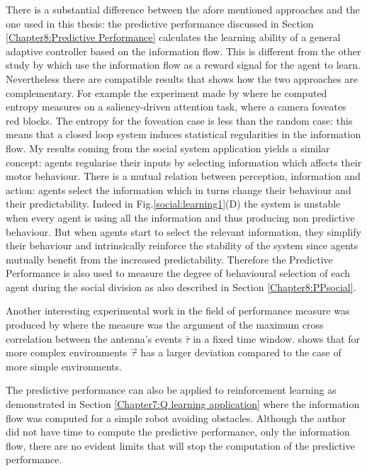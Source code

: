 There is a substantial difference between the afore mentioned approaches and the
one used in this thesis:
the predictive performance discussed in Section \ref{Chapter8:Predictive Performance}
calculates the learning ability of a general adaptive controller
 based on the information flow.
This is different from the other study by \citet{organizationInfo,LungarellaInformationStructure,Ay2008:PredInformation} 
which use the information flow as a reward signal for the agent to learn.
Nevertheless there are compatible results that shows how the
two approaches are complementary.
For example the experiment made by \citet{LungarellaInformationStructure}
where he computed entropy measures on a saliency-driven attention
task, where a camera foveates red blocks. The entropy for the
foveation case is less than the random case:
this means that a closed loop system induces statistical regularities
in the information flow.
My results coming from the social system application yields
a similar concept: agents regularise their inputs
by selecting information which affects their motor behaviour.
There is a mutual relation between perception, information and action:
agents select the information which in turns change their
behaviour and their predictability.
Indeed in Fig.\ref{social:learning1}(D) the system is unstable
when every agent is using all the information and thus producing
non predictive behaviour. But when agents start to select the
relevant information, they simplify their behaviour and intrinsically reinforce
the stability of the system since agents mutually benefit from the increased predictability.
Therefore the Predictive Performance is also used to measure the degree of behavioural
selection of each agent during the social division as also described in Section \ref{Chapter8:PPsocial}.

Another interesting experimental work in the field of performance measure was produced 
by \citet{Kulvicius2009:analysisdifferential} where the measure was the argument of the maximum 
cross correlation between the antenna's events $\bar{\tau}$ in a fixed time window.
\citet{Kulvicius2009:analysisdifferential} shows that for more complex environments $\vec{\tau}$ has a larger
deviation compared to the case of more simple environments.

The predictive performance can also be applied to reinforcement learning \citep{TD}
as demonstrated in Section \ref{Chapter7:Q learning application} where
the information flow was computed for a simple robot avoiding obstacles.
Although the author did not have time to compute the predictive performance, 
only the information flow, there are no evident limits that will stop
the computation of the predictive performance.


